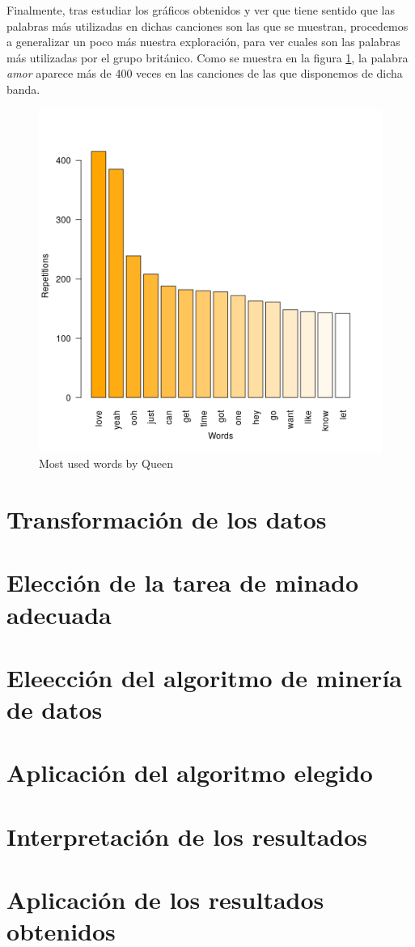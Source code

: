 Finalmente, tras estudiar los gráficos obtenidos y ver que tiene sentido que las palabras más utilizadas en dichas canciones son las que se muestran, procedemos a generalizar un poco más nuestra exploración, para ver cuales son las palabras más utilizadas por el grupo británico. Como se muestra en la figura \ref{fig:queen_songs}, la palabra \textit{amor} aparece más de 400 veces en las canciones de las que disponemos de dicha banda.
\begin{figure}[h]
	\centering
	\includegraphics[width=0.7\linewidth]{Imagenes/queen_most_used_words}
	\caption{Most used words by Queen}
	\label{fig:queen_songs}
\end{figure}

\section{Transformación de los datos}
\section{Elección de la tarea de minado adecuada}
\section{Eleección del algoritmo de minería de datos}
\section{Aplicación del algoritmo elegido}
\section{Interpretación de los resultados}
\section{Aplicación de los resultados obtenidos}